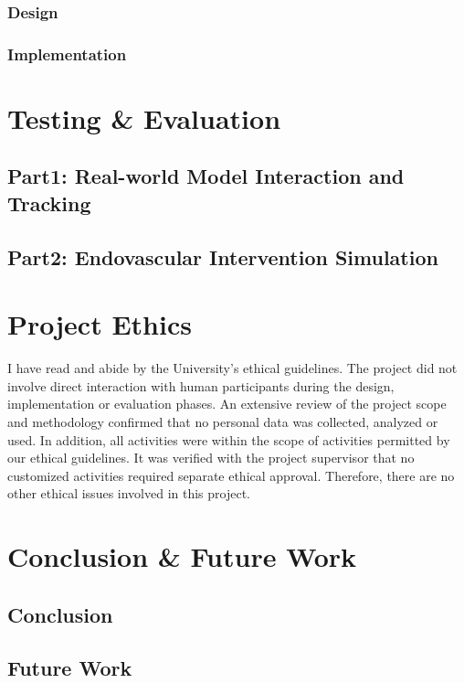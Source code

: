 \documentclass[12pt]{article}
\begin{document}
\subsubsection{Design}

\subsubsection{Implementation}


\section{Testing \& Evaluation}
\subsection{Part1: Real-world Model Interaction and Tracking}

\subsection{Part2: Endovascular Intervention Simulation}

\section{Project Ethics}
I have read and abide by the University’s ethical guidelines\cite{UoL_COMP390_2023-24}. The project did not involve direct interaction with human
participants during the design, implementation or evaluation phases. An extensive review of the project scope and methodology
confirmed that no personal data was collected, analyzed or used. In addition, all activities were within the scope of activities
permitted by our ethical guidelines. It was verified with the project supervisor that no customized activities required separate
ethical approval. Therefore, there are no other ethical issues involved in this project.
\section{Conclusion \& Future Work}
\subsection{Conclusion}

\subsection{Future Work}
\end{document}
